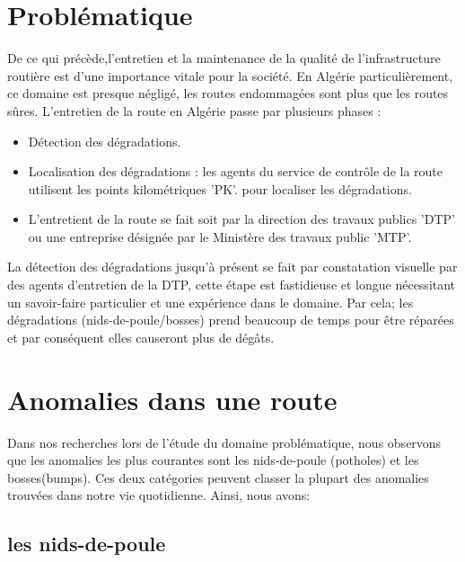   \section{Problématique}
  De ce qui précède,l’entretien et la maintenance de la qualité de l'infrastructure routière est d'une importance vitale pour la société.\newline
  En Algérie particulièrement, ce domaine est presque négligé, les routes endommagées sont plus que les routes sûres.\newline 
  L’entretien de la route en Algérie  passe par plusieurs phases : 
      \begin{itemize}
          \item Détection des dégradations.
          \item Localisation des dégradations : les agents du service de contrôle de la route utilisent les points kilométriques 'PK'. pour localiser les dégradations.
          \item L’entretient de la route se fait soit par la direction des travaux publics 'DTP' ou une entreprise désignée par le Ministère des travaux public 'MTP'. 
      \end{itemize}
  La détection des dégradations jusqu’à présent se fait par constatation visuelle par des agents d’entretien de la DTP, cette étape est fastidieuse et longue nécessitant un savoir-faire particulier et une expérience dans le domaine. Par cela; les dégradations (nids-de-poule/bosses) prend beaucoup de temps pour être réparées et par conséquent elles causeront plus de dégâts.

  \section{Anomalies dans une route}
Dans nos recherches lors de l'étude du domaine problématique, nous observons que les anomalies
 les plus courantes sont les nids-de-poule (potholes) et les bosses(bumps).
  Ces deux catégories peuvent classer la plupart des anomalies trouvées dans notre vie quotidienne. Ainsi, nous avons:

  \subsection{les nids-de-poule}

